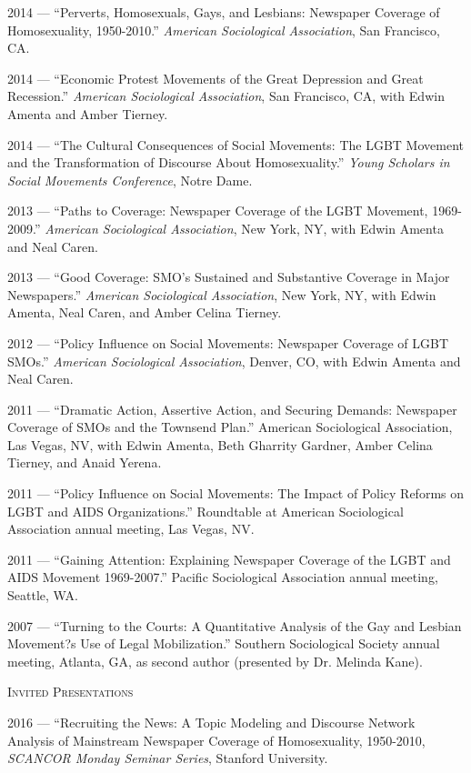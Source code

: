 \documentclass[11pt]{article}
\newcommand{\sectionheader}[1]{
{\Large
\textsc{#1}}
}
\begin{document}
2014 --- ``Perverts, Homosexuals, Gays, and Lesbians: Newspaper Coverage of Homosexuality, 1950-2010.'' \textit{American Sociological Association}, San Francisco, CA. 

2014 --- ``Economic Protest Movements of the Great Depression and Great Recession.'' \textit{American Sociological Association}, San Francisco, CA, with Edwin Amenta and Amber Tierney.

2014 --- ``The Cultural Consequences of Social Movements: The LGBT Movement and the Transformation of Discourse About Homosexuality.'' \textit{Young Scholars in Social Movements Conference}, Notre Dame.

2013 --- ``Paths to Coverage: Newspaper Coverage of the LGBT Movement, 1969-2009.'' \textit{American Sociological Association}, New York, NY, with Edwin Amenta and Neal Caren.

2013 --- ``Good Coverage: SMO's Sustained and Substantive Coverage in Major Newspapers.'' \textit{American Sociological Association}, New York, NY, with Edwin Amenta, Neal Caren, and Amber Celina Tierney.

2012 --- ``Policy Influence on Social Movements: Newspaper Coverage of LGBT SMOs.'' \textit{American Sociological Association}, Denver, CO, with Edwin Amenta and Neal Caren.

2011 --- ``Dramatic Action, Assertive Action, and Securing Demands: Newspaper Coverage of SMOs and the Townsend Plan.'' American Sociological Association, Las Vegas, NV, with Edwin Amenta, Beth Gharrity Gardner, Amber Celina Tierney, and Anaid Yerena.

2011 --- ``Policy Influence on Social Movements: The Impact of Policy Reforms on LGBT and AIDS Organizations.'' Roundtable at American Sociological Association annual meeting, Las Vegas, NV.

2011 --- ``Gaining Attention: Explaining Newspaper Coverage of the LGBT and AIDS Movement 1969-2007.'' Pacific Sociological Association annual meeting, Seattle, WA.

2007	 --- ``Turning to the Courts: A Quantitative Analysis of the Gay and Lesbian Movement?s Use of Legal Mobilization.'' Southern Sociological Society annual meeting, Atlanta, GA, as second author (presented by Dr. Melinda Kane).

\sectionheader{Invited Presentations}

2016 --- ``Recruiting the News: A Topic Modeling and Discourse Network Analysis of Mainstream Newspaper Coverage of Homosexuality, 1950-2010, \textit{SCANCOR Monday Seminar Series}, Stanford University.
\end{document}
